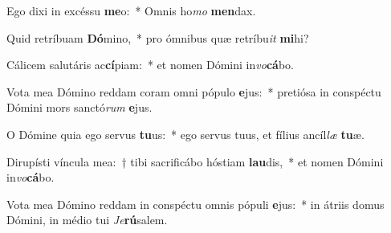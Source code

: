 \item Ego dixi in excéssu \textbf{me}o:~* Omnis ho\textit{mo} \textbf{men}dax.
\item Quid retríbuam \textbf{Dó}mino,~* pro ómnibus quæ retríbu\hspace{0.03em}\textit{it} \textbf{mi}hi?
\item Cálicem salutáris ac\textbf{cí}piam:~* et nomen Dómini in\textit{vo}\textbf{cá}bo.
\item Vota mea Dómino reddam coram omni pópulo \textbf{e}jus:~* pretiósa in conspé\-ctu Dómini mors sanctó\textit{rum} \textbf{e}jus.
\item O Dómine quia ego servus \textbf{tu}us:~* ego servus tuus, et fílius ancíl\textit{læ} \textbf{tu}æ.
\item Dirupísti víncula mea:~† tibi sacrificábo hóstiam \textbf{lau}dis,~* et nomen Dómini in\textit{vo}\textbf{cá}bo.
\item Vota mea Dómino reddam in conspéctu omnis pópuli \textbf{e}jus:~* in átriis domus Dómini, in médio tui \hspace{0.03em}\textit{Je}\textbf{rú}salem.
